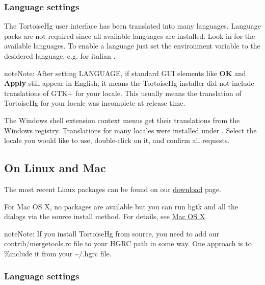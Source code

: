 \documentclass[letterpaper,10pt,english]{manual}
\begin{document}
\subsubsection{Language settings}

The TortoiseHg user interface has been translated into many languages.
Language packs are not required since all available languages are
installed. Look in  for the
available languages. To enable a language just set the environment
variable  to the desidered language, e.g. for italian
.

\begin{notice}{note}{Note:}
After setting LANGUAGE, if standard GUI elements like \textbf{OK}
and \textbf{Apply} still appear in English, it means the
TortoiseHg installer did not include translations of GTK+ for your
locale.  This usually means the translation of TortoiseHg for your
locale was incomplete at release time.
\end{notice}

The Windows shell extension context menus get their translations from
the Windows registry.  Translations for many locales were installed
under .  Select the
locale you would like to use, double-click on it, and confirm all
requests.


\subsection{On Linux and Mac}

The most recent Linux packages can be found on our \href{http://tortoisehg.bitbucket.org/download/linux.html}{download} page.

For Mac OS X, no packages are available but you can run hgtk and all the
dialogs via the source install method. For details, see
\href{http://bitbucket.org/tortoisehg/stable/wiki/MacOSX}{Mac OS X}.

\begin{notice}{note}{Note:}
If you install TortoiseHg from source, you need to add our
contrib/mergetools.rc file to your HGRC path in some way.  One
approach is to \%include it from your \textasciitilde{}/.hgrc file.
\end{notice}


\subsubsection{Language settings}
\end{document}
